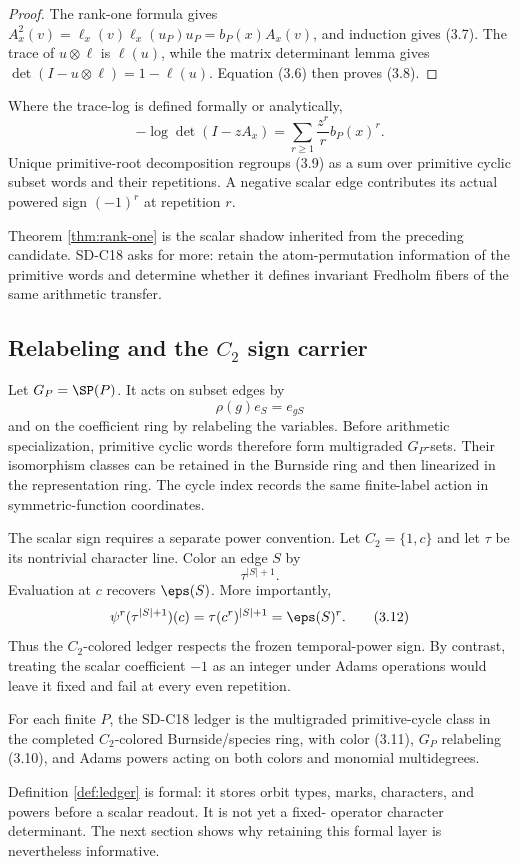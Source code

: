 \begin{proof}
The rank-one formula gives
$A_x^2(v)=\ell_x(v)\ell_x(u_P)u_P=b_P(x)A_x(v)$, and induction gives
(3.7).  The trace of $u\otimes\ell$ is $\ell(u)$, while the matrix
determinant lemma gives $\det(I-u\otimes\ell)=1-\ell(u)$.  Equation (3.6)
then proves (3.8).
\end{proof}

Where the trace-log is defined formally or analytically,
\[
 -\log\det(I-zA_x)
 =\sum_{r\ge1}\frac{z^r}{r}b_P(x)^r.
 \tag{3.9}
\]
Unique primitive-root decomposition regroups (3.9) as a sum over primitive
cyclic subset words and their repetitions.  A negative scalar edge contributes
its actual powered sign $(-1)^r$ at repetition $r$.

Theorem \ref{thm:rank-one} is the scalar shadow inherited from the preceding
candidate.  SD-C18 asks for more: retain the atom-permutation information of
the primitive words and determine whether it defines invariant Fredholm
fibers of the same arithmetic transfer.

\subsection{Relabeling and the \texorpdfstring{$C_2$}{C2} sign carrier}

Let $G_P=\SP(P)$.  It acts on subset edges by
\[
  \rho(g)e_S=e_{gS}
  \tag{3.10}
\]
and on the coefficient ring by relabeling the variables.  Before arithmetic
specialization, primitive cyclic words therefore form multigraded $G_P$-sets.
Their isomorphism classes can be retained in the Burnside ring and then
linearized in the representation ring.  The cycle index records the same
finite-label action in symmetric-function coordinates.

The scalar sign requires a separate power convention.  Let $C_2=\{1,c\}$
and let $\tau$ be its nontrivial character line.  Color an edge $S$ by
\[
  \tau^{|S|+1}.
  \tag{3.11}
\]
Evaluation at $c$ recovers $\eps(S)$.  More importantly,
\[
  \psi^r(\tau^{|S|+1})(c)
  =\tau(c^r)^{|S|+1}
  =\eps(S)^r.
  \tag{3.12}
\]
Thus the $C_2$-colored ledger respects the frozen temporal-power sign.  By
contrast, treating the scalar coefficient $-1$ as an integer under Adams
operations would leave it fixed and fail at every even repetition.

\begin{definition}
\label{def:ledger}
For each finite $P$, the SD-C18 ledger is the multigraded primitive-cycle
class in the completed $C_2$-colored Burnside/species ring, with color
(3.11), $G_P$ relabeling (3.10), and Adams powers acting on both colors and
monomial multidegrees.
\end{definition}

Definition \ref{def:ledger} is formal: it stores orbit types, marks,
characters, and powers before a scalar readout.  It is not yet a fixed-
operator character determinant.  The next section shows why retaining this
formal layer is nevertheless informative.
